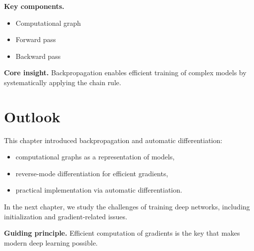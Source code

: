 \medskip

\noindent
\textbf{Key components.}
\begin{itemize}
    \item Computational graph
    \item Forward pass
    \item Backward pass
\end{itemize}

\medskip

\noindent
\textbf{Core insight.}  
Backpropagation enables efficient training of complex models by systematically applying the chain rule.

\section{Outlook}

This chapter introduced backpropagation and automatic differentiation:
\begin{itemize}
    \item computational graphs as a representation of models,
    \item reverse-mode differentiation for efficient gradients,
    \item practical implementation via automatic differentiation.
\end{itemize}

\medskip

In the next chapter, we study the challenges of training deep networks, including initialization and gradient-related issues.

\medskip

\noindent
\textbf{Guiding principle.}  
Efficient computation of gradients is the key that makes modern deep learning possible.